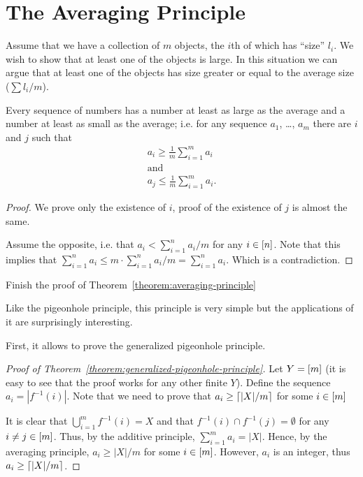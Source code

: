 \section{The Averaging Principle}
Assume that we have a collection of $m$ objects, the $i$th of which has
``size'' $l_i$. We wish to show that at least one of the objects is large.
In this situation we can argue that at least one of the objects has size
greater or equal to the average size ($\sum l_i / m$).
\begin{theorem}
\label{theorem:averaging-principle}
  Every sequence of numbers has a number at least as large as the average and a
  number at least as small as the average; i.e. for any sequence $a_1$, \dots,
  $a_m$ there are $i$ and $j$ such that
  \begin{gather*}
    a_i \ge \frac{1}{m} \sum_{i = 1}^m a_i \\
    \text{and} \\
    a_j \le \frac{1}{m} \sum_{i = 1}^m a_i.
  \end{gather*}
\end{theorem}
\begin{proof}
  We prove only the existence of $i$, proof of the existence of $j$ is almost
  the same.

  Assume the opposite, i.e. that $a_i < \sum_{i = 1}^n a_i / m$
  for any $i \in {[{n}]}$. Note that this implies that
  $\sum_{i = 1}^n a_i \le m \cdot \sum_{i = 1}^n a_i / m = \sum_{i = 1}^n a_i$.
  Which is a contradiction.
\end{proof}

\begin{exercise}
  Finish the proof of Theorem~\ref{theorem:averaging-principle}
\end{exercise}

Like the pigeonhole principle, this principle is very simple but the
applications of it are surprisingly interesting.

First, it allows to prove the generalized pigeonhole principle.
\begin{proof}[Proof of Theorem~\ref{theorem:generalized-pigeonhole-principle}]
  Let $Y = {[{m}]}$ (it is easy to see that the proof works for any other finite
  $Y$). Define the sequence $a_i = |f^{-1}(i)|$.
  Note that we need to prove that $a_i \ge \left\lceil {|X| / m} \right\rceil$ for some
  $i \in {[{m}]}$

  It is clear that $\bigcup_{i = 1}^m f^{-1}(i) = X$ and that $f^{-1}(i) \cap
  f^{-1}(j) = \emptyset$ for any $i \neq j \in {[{m}]}$. Thus, by the additive
  principle, $\sum_{i = 1}^m a_i = |X|$. Hence, by the averaging principle,
  $a_i \ge |X| / m$ for some $i \in {[{m}]}$. However, $a_i$ is an integer, thus
  $a_i \ge \left\lceil {|X| / m} \right\rceil$.
\end{proof}

